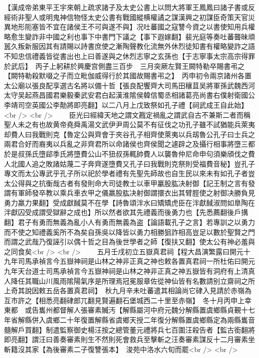 【漢成帝弟東平王宇來朝上疏求諸子及太史公書上以問大將軍王鳳鳳曰諸子書或反經術非聖人或明鬼神信物怪太史公書有戰國縱横權譎之謀漢興之初謀臣奇策天官災異地形阨塞皆不宜在諸侯王不可與遂不與】况吐蕃國之寇讐今資之以書使知用兵權略愈生變詐非中國之利也事下中書門下議之【事下遐嫁翻】裴光庭等奏吐蕃聾昧頑嚚久叛新服因其有請賜以詩書庶使之漸陶聲教化流無外休烈徒知書有權略變詐之語不知忠信禮義皆從書出也上曰善遂與之休烈志寧之玄孫也【于志寧事太宗高宗得罪於武后】　丙子上躬耕於興慶宫側盡三百步　三月突厥左賢王闕特勒卒賜書弔之【闕特勒殺默啜之子而立毗伽威得行於其國故賜書弔之】　丙申初令兩京諸州各置太公廟以張良配享選古名將以備十哲【張良配饗齊大司馬田穰苴吴將軍孫武魏西河太守吴起燕昌國君樂毅秦武安君白起漢淮隂侯韓信蜀丞相諸葛亮尚書右僕射衛國公李靖司空英國公李勣將即亮翻】以二八月上戊致祭如孔子禮【祠武成王自此始】<br />
<br />
　　臣光曰經緯天地之謂文戡定禍亂之謂武自古不兼斯二者而稱聖人未之有也故黄帝堯舜禹湯文武伊尹周公莫不有征伐之功孔子雖不試猶能兵萊夷却費人曰我戰則克【魯定公與齊會于夾谷孔子相齊使萊夷以兵刼魯公孔子曰士兵之兩君合好而裔夷以兵亂之非齊君所以命諸侯也齊侯聞之遽辟之及攝行相事將墮三都於是叔孫氏墮郈季氏將墮費公山不狃叔孫輒帥費人以襲魯仲尼命申句須樂頎伐之費人北國人追之敗諸姑蔑二子奔齊遂墮費又孔子曰我戰則克祭則受福費音秘】豈孔子專文而太公專武乎孔子所以祀於學者禮有先聖先師故也自生民以來未有如孔子者豈太公得與之抗衡哉古者有發則命大司徒教士以車甲臝股肱决射御【記王制之言有發謂有軍師發卒教以乘兵車衣甲之儀羸股肱决射御謂擐衣出其臂脛使之射御决勝負見勇力羸力果翻】受成獻馘莫不在學【詩魯頌泮水曰矯矯虎臣在泮獻馘淑問如臯陶在泮獻囚受成謂受獄辭之成也】所以然者欲其先禮義而後勇力也【先悉薦翻後戶搆翻】君子有勇而無義為亂小人有勇而無義為盗【論語載孔子之言】若專訓之以勇力而不使之知禮義奚所不為矣自孫吳以降皆以勇力相勝狙詐相高豈足以數於聖賢之門而謂之武哉乃復誣引以偶十哲之目為後世學者之師【復扶又翻】使太公有神必羞與之同食矣<br />
<br />
　　五月壬戌初立五嶽真君祠【程大昌演繁露曰開元十九年司馬承禎言今五嶽神祠是山林之神非正真之神也敕各置真君祠一所杜佑曰開元九年天台道士司馬承禎言今五嶽神祠是山林之神非正真之神五嶽皆有洞府有上清真人降任其職山川風雨隂陽氣序是所理焉冠冕服章佐從神仙皆有名數請别立齋祠之所上奇其說因敕五岳各置真君祠】　秋九月辛未吐蕃遣其相論尚它硉入見請於赤嶺為互市許之【相悉亮翻硉郎兀翻見賢遍翻石堡城西二十里至赤嶺】　冬十月丙申上幸東都　或告巂州都督解人張審素贓汚【解縣屬河中府元魏分解縣置虞鄉縣貞覲十七年省解縣併入虞鄉二十年復置解縣省虞鄉天授二年復分解縣置虞鄉縣定為兩縣巂音髓解戶買翻】制遣監察御史楊汪按之總管董元禮將兵七百圍汪殺告者【監古銜翻將即亮翻】謂汪曰善奏審素則生不然則死會救兵至擊斬之汪奏審素謀反十二月審素坐斬籍沒其家【為後審素二子復讐張本】　浚苑中洛水六旬而罷<br />
<br />
